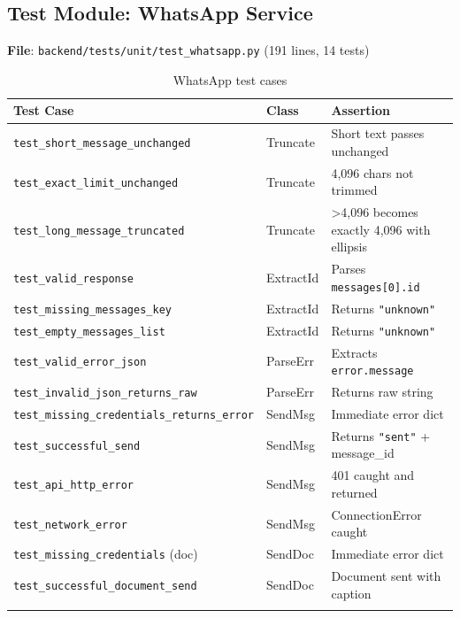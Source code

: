 \documentclass[12pt, a4paper]{article}
\newcommand{\file}[1]{\texttt{\color{accent}#1}}
\begin{document}
\subsection{Test Module: WhatsApp Service}
\label{sec:test_wa}

\textbf{File}: \file{backend/tests/unit/test\_whatsapp.py} \quad (191 lines, 14 tests)

\begin{longtable}{p{5.5cm} p{2cm} p{5.5cm}}
  \toprule
  \textbf{Test Case} & \textbf{Class} & \textbf{Assertion} \\
  \midrule
  \texttt{test\_short\_message\_unchanged}        & Truncate & Short text passes unchanged \\
  \texttt{test\_exact\_limit\_unchanged}          & Truncate & 4,096 chars not trimmed \\
  \texttt{test\_long\_message\_truncated}         & Truncate & >4,096 becomes exactly 4,096 with ellipsis \\
  \texttt{test\_valid\_response}                  & ExtractId & Parses \texttt{messages[0].id} \\
  \texttt{test\_missing\_messages\_key}           & ExtractId & Returns \texttt{"unknown"} \\
  \texttt{test\_empty\_messages\_list}            & ExtractId & Returns \texttt{"unknown"} \\
  \texttt{test\_valid\_error\_json}               & ParseErr  & Extracts \texttt{error.message} \\
  \texttt{test\_invalid\_json\_returns\_raw}      & ParseErr  & Returns raw string \\
  \texttt{test\_missing\_credentials\_returns\_error} & SendMsg & Immediate error dict \\
  \texttt{test\_successful\_send}                 & SendMsg & Returns \texttt{"sent"} + message\_id \\
  \texttt{test\_api\_http\_error}                 & SendMsg & 401 caught and returned \\
  \texttt{test\_network\_error}                   & SendMsg & ConnectionError caught \\
  \texttt{test\_missing\_credentials} (doc)       & SendDoc & Immediate error dict \\
  \texttt{test\_successful\_document\_send}       & SendDoc & Document sent with caption \\
  \bottomrule
  \caption{WhatsApp test cases}
\end{longtable}
\end{document}
